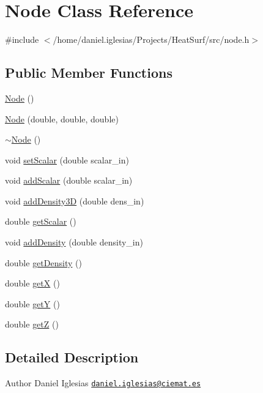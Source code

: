 \hypertarget{classNode}{\section{Node Class Reference}
\label{classNode}
}


{\ttfamily \#include $<$/home/daniel.\-iglesias/\-Projects/\-Heat\-Surf/src/node.\-h$>$}

\subsection*{Public Member Functions}
\begin{DoxyCompactItemize}
\item 
\hyperlink{classNode_ad7a34779cad45d997bfd6d3d8043c75f}{Node} ()
\item 
\hyperlink{classNode_ab67eabb0fef1465a1d7d1e11997ddd4d}{Node} (double, double, double)
\item 
\hyperlink{classNode_aa0840c3cb5c7159be6d992adecd2097c}{$\sim$\-Node} ()
\item 
void \hyperlink{classNode_a93d1fc91852d3698d94625f0178df03f}{set\-Scalar} (double scalar\-\_\-in)
\item 
void \hyperlink{classNode_aaa144bb5a91e238a24714f9c21e1f691}{add\-Scalar} (double scalar\-\_\-in)
\item 
void \hyperlink{classNode_a30669c547c3613eb296358270fa034fb}{add\-Density3\-D} (double dens\-\_\-in)
\item 
double \hyperlink{classNode_aaa123501583ea9775583c2c46f755c8f}{get\-Scalar} ()
\item 
void \hyperlink{classNode_ad1eeb7e6ca4fc6d627ca6ff662f8e442}{add\-Density} (double density\-\_\-in)
\item 
double \hyperlink{classNode_a586272c977653ba24e1292b4dc42f8c6}{get\-Density} ()
\item 
double \hyperlink{classNode_a8d8ccf6a6da7717ea6aa67e52c7c9017}{get\-X} ()
\item 
double \hyperlink{classNode_a8877121bf44537ccbe2f3c441fa3b664}{get\-Y} ()
\item 
double \hyperlink{classNode_ab26d80e97604621eab868ebacda71304}{get\-Z} ()
\end{DoxyCompactItemize}


\subsection{Detailed Description}
\begin{DoxyAuthor}{Author}
Daniel Iglesias \href{mailto:daniel.iglesias@ciemat.es}{\tt daniel.\-iglesias@ciemat.\-es} 
\end{DoxyAuthor}


